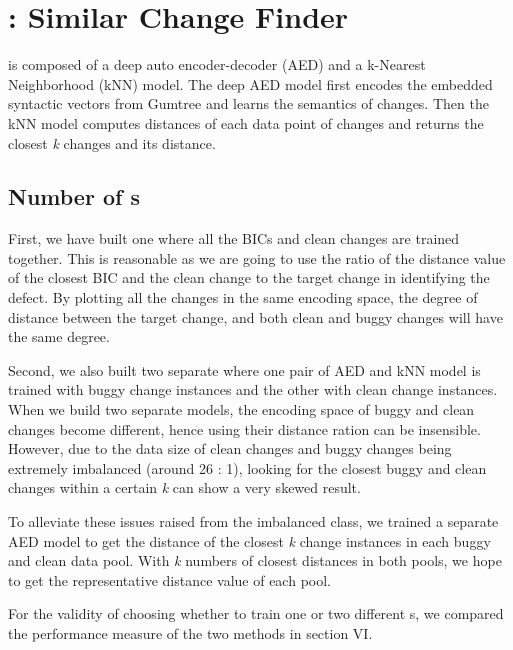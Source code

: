\section{{\simfin}: Similar Change Finder}
{\simfin} is composed of a deep auto encoder-decoder (AED) and a k-Nearest Neighborhood (kNN) model.
The deep AED model first encodes the embedded syntactic vectors from Gumtree and learns the semantics of changes.
Then the kNN model computes distances of each data point of changes and returns the closest \emph{k} changes and its distance.

\subsection{Number of {\simfin}s}
First, we have built one {\simfin} where all the BICs and clean changes are trained together.
This is reasonable as we are going to use the ratio of the distance value of the closest BIC and the clean change to the target change in identifying the defect.
By plotting all the changes in the same encoding space, the degree of distance between the target change, and both clean and buggy changes will have the same degree.

Second, we also built two separate {\simfin} where one pair of AED and kNN model is trained with buggy change instances and the other with clean change instances.
When we build two separate {\simfin} models, the encoding space of buggy and clean changes become different, hence using their distance ration can be insensible.
However, due to the data size of clean changes and buggy changes being extremely imbalanced (around 26 : 1), looking for the closest buggy and clean changes within a certain \emph{k} can show a very skewed result.

To alleviate these issues raised from the imbalanced class, we trained a separate AED model to get the distance of the closest \emph{k} change instances in each buggy and clean data pool.
With \emph{k} numbers of closest distances in both pools, we hope to get the representative distance value of each pool.

For the validity of choosing whether to train one or two different {\simfin}s, we compared the performance measure of the two methods in section VI.

